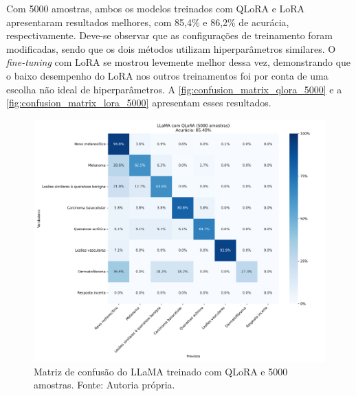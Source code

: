 Com 5000 amostras, ambos os modelos treinados com \ac{QLoRA} e \ac{LoRA} apresentaram resultados melhores, com 85,4\% e 86,2\% de acurácia, respectivamente. Deve-se
observar que as configurações de treinamento foram modificadas, sendo que os dois métodos utilizam hiperparâmetros similares. O \textit{fine-tuning} com \ac{LoRA} se
mostrou levemente melhor dessa vez, demonstrando que o baixo desempenho do \ac{LoRA} nos outros treinamentos foi por conta de uma escolha não ideal de hiperparâmetros.
A \autoref{fig:confusion_matrix_qlora_5000} e a \autoref{fig:confusion_matrix_lora_5000} apresentam esses resultados.

\clearpage

\begin{figure}[ht]
    \centering
    \includegraphics[width=1\columnwidth,keepaspectratio]{images/confusion_matrix_qlora_5000.png}
    \caption{\small Matriz de confusão do \ac{LLaMA} treinado com \ac{QLoRA} e 5000 amostras. Fonte: Autoria
        própria.}
    \label{fig:confusion_matrix_qlora_5000}
\end{figure}

\clearpage

